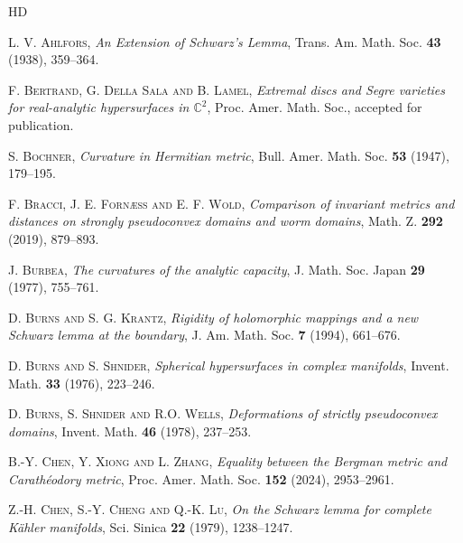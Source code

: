 \documentclass[12pt] {article}
\numberwithin{equation}{section}
\begin{document}
  \begin{thebibliography}{HD}

{\fontsize{11}{11}\selectfont

 \textsc{L. V. Ahlfors}, \emph{An Extension of Schwarz's Lemma}, Trans. Am. Math. Soc. {\bf 43} (1938), 359--364.



 \textsc{F. Bertrand, G. Della Sala and B. Lamel}, \emph{Extremal discs and Segre varieties for real-analytic hypersurfaces in $\mathbb C^2$}, Proc. Amer. Math. Soc., accepted for publication. 




 \textsc{S. Bochner}, \textit{Curvature in Hermitian metric}, Bull. Amer. Math. Soc.  {\bf 53} (1947), 179--195.  


 \textsc{F. Bracci, J. E. Forn{\ae}ss and E. F. Wold}, \emph{Comparison of invariant metrics and distances on strongly pseudoconvex domains and worm domains}, Math. Z. {\bf 292} (2019), 879--893.



 \textsc{J. Burbea}, \emph{The curvatures of the analytic capacity}, J. Math. Soc. Japan  {\bf 29} (1977), 755--761.




 \textsc{D. Burns and S. G. Krantz}, \emph{Rigidity of holomorphic mappings and a new Schwarz lemma at the boundary}, J. Am. Math. Soc. {\bf 7} (1994), 661--676.

 \textsc{D. Burns and S. Shnider}, \emph{Spherical hypersurfaces in complex manifolds}, Invent. Math. {\bf 33} (1976), 223--246.


 \textsc{D. Burns, S. Shnider and R.O. Wells}, \emph{Deformations of strictly pseudoconvex domains}, Invent. Math. {\bf 46} (1978), 237--253.




 




 \textsc{B.-Y. Chen, Y. Xiong and L. Zhang}, \textit{Equality between the Bergman metric and Carath\'eodory metric}, Proc. Amer. Math. Soc. {\bf 152} (2024), 2953--2961.



 \textsc{Z.-H. Chen, S.-Y. Cheng and Q.-K. Lu}, \emph{On the Schwarz lemma for complete K\"ahler manifolds}, Sci. Sinica {\bf 22} (1979), 1238--1247.



}
\end{thebibliography}
\end{document}
